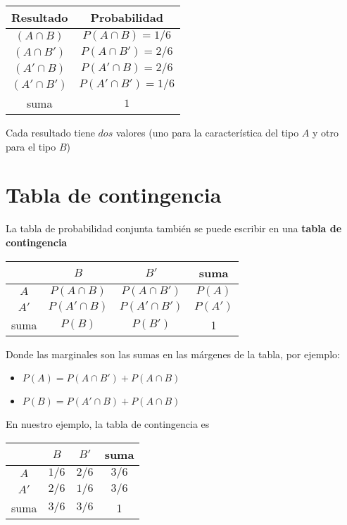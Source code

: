 \documentclass[
]{book}
\providecommand{\tightlist}{%
  \setlength{\itemsep}{0pt}\setlength{\parskip}{0pt}}
\begin{document}
\begin{longtable}[]{@{}cc@{}}
\toprule
Resultado & Probabilidad \\
\midrule
\endhead
\((A \cap B)\) & \(P(A \cap B)=1/6\) \\
\((A\cap B')\) & \(P(A \cap B')=2/6\) \\
\((A' \cap B)\) & \(P(A' \cap B)=2/6\) \\
\((A' \cap B')\) & \(P(A' \cap B')=1/6\) \\
suma & \(1\) \\
\bottomrule
\end{longtable}

Cada resultado tiene \(dos\) valores (uno para la característica del tipo \(A\) y otro para el tipo \(B\))

\hypertarget{tabla-de-contingencia}{%
\section{Tabla de contingencia}\label{tabla-de-contingencia}}

La tabla de probabilidad conjunta también se puede escribir en una \textbf{tabla de contingencia}

\begin{longtable}[]{@{}cccc@{}}
\toprule
& \(B\) & \(B'\) & suma \\
\midrule
\endhead
\(A\) & \(P(A \cap B )\) & \(P(A\cap B' )\) & \(P(A)\) \\
\(A'\) & \(P(A'\cap B )\) & \(P(A'\cap B' )\) & \(P(A')\) \\
suma & \(P(B)\) & \(P(B')\) & 1 \\
\bottomrule
\end{longtable}

Donde las marginales son las sumas en las márgenes de la tabla, por ejemplo:

\begin{itemize}
\tightlist
\item
  \(P(A)=P(A \cap B') + P(A \cap B)\)
\item
  \(P(B)=P(A' \cap B) +P(A \cap B)\)
\end{itemize}

En nuestro ejemplo, la tabla de contingencia es

\begin{longtable}[]{@{}cccc@{}}
\toprule
& \(B\) & \(B'\) & suma \\
\midrule
\endhead
\(A\) & \(1/6\) & \(2/6\) & \(3/6\) \\
\(A'\) & \(2/6\) & \(1/6\) & \(3/6\) \\
suma & \(3/6\) & \(3/6\) & 1 \\
\bottomrule
\end{longtable}
\end{document}
